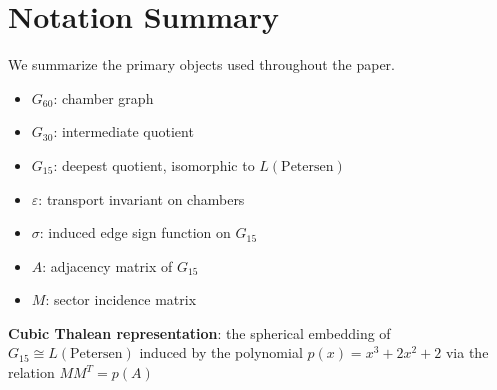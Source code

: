\section{Notation Summary}

We summarize the primary objects used throughout the paper.

\begin{itemize}
\item $G_{60}$: chamber graph
\item $G_{30}$: intermediate quotient
\item $G_{15}$: deepest quotient, isomorphic to $L(\mathrm{Petersen})$
\item $\varepsilon$: transport invariant on chambers
\item $\sigma$: induced edge sign function on $G_{15}$
\item $A$: adjacency matrix of $G_{15}$
\item $M$: sector incidence matrix
\end{itemize}

\item \textbf{Cubic Thalean representation}: the spherical embedding of
$G_{15} \cong L(\mathrm{Petersen})$ induced by the polynomial
$p(x) = x^3 + 2x^2 + 2$ via the relation $M M^T = p(A)$
